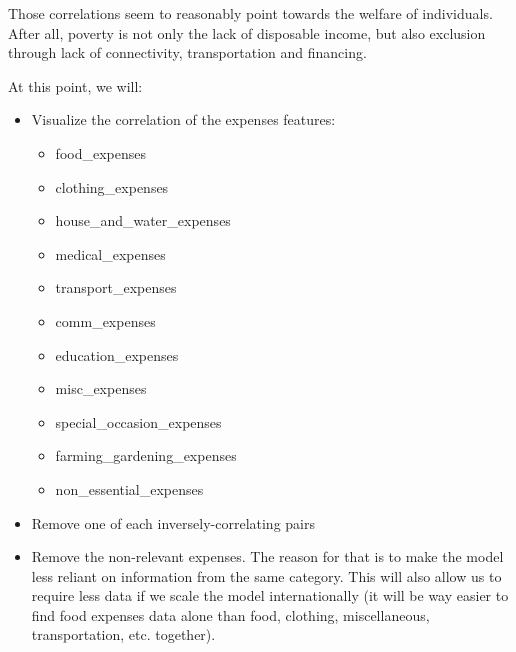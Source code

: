 \documentclass{article}
\begin{document}
Those correlations seem to reasonably point towards the welfare of individuals. After all, poverty is not only the lack of disposable income, but also exclusion through lack of connectivity, transportation and financing.

At this point, we will:

\begin{itemize}
  \item Visualize the correlation of the expenses features:
  \begin{itemize}
    \item food\_expenses
    \item clothing\_expenses
    \item house\_and\_water\_expenses
    \item medical\_expenses
    \item transport\_expenses
    \item comm\_expenses
    \item education\_expenses
    \item misc\_expenses
    \item special\_occasion\_expenses
    \item farming\_gardening\_expenses
    \item non\_essential\_expenses
  \end{itemize}
  \item Remove one of each inversely-correlating pairs
  \item Remove the non-relevant expenses. The reason for that is to make the model less reliant on information from the same category. This will also allow us to require less data if we scale the model internationally (it will be way easier to find food expenses data alone than food, clothing, miscellaneous, transportation, etc. together).
\end{itemize}
\end{document}
